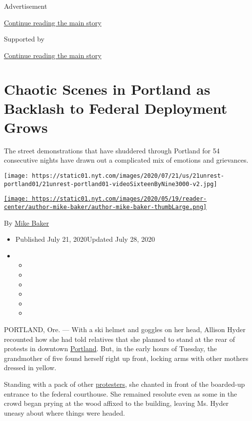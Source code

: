 Advertisement

\protect\hyperlink{after-top}{Continue reading the main story}

Supported by

\protect\hyperlink{after-sponsor}{Continue reading the main story}

\hypertarget{chaotic-scenes-in-portland-as-backlash-to-federal-deployment-grows}{%
\section{Chaotic Scenes in Portland as Backlash to Federal Deployment
Grows}\label{chaotic-scenes-in-portland-as-backlash-to-federal-deployment-grows}}

The street demonstrations that have shuddered through Portland for 54
consecutive nights have drawn out a complicated mix of emotions and
grievances.

\texttt{[image: https://static01.nyt.com/images/2020/07/21/us/21unrest-portland01/21unrest-portland01-videoSixteenByNine3000-v2.jpg]}

\href{https://www.nytimes.com/by/mike-baker}{\texttt{[image: https://static01.nyt.com/images/2020/05/19/reader-center/author-mike-baker/author-mike-baker-thumbLarge.png]}}

By \href{https://www.nytimes.com/by/mike-baker}{Mike Baker}

\begin{itemize}
\item
  Published July 21, 2020Updated July 28, 2020
\item
  \begin{itemize}
  \item
  \item
  \item
  \item
  \item
  \item
  \end{itemize}
\end{itemize}

PORTLAND, Ore. --- With a ski helmet and goggles on her head, Allison
Hyder recounted how she had told relatives that she planned to stand at
the rear of protests in downtown
\href{https://www.nytimes.com/2020/07/28/us/portland-protests-fact-check.html}{Portland}.
But, in the early hours of Tuesday, the grandmother of five found
herself right up front, locking arms with other mothers dressed in
yellow.

Standing with a pack of other
\href{https://www.nytimes.com/interactive/2020/07/22/us/portland-protests.html}{protesters},
she chanted in front of the boarded-up entrance to the federal
courthouse. She remained resolute even as some in the crowd began prying
at the wood affixed to the building, leaving Ms. Hyder uneasy about
where things were headed.

